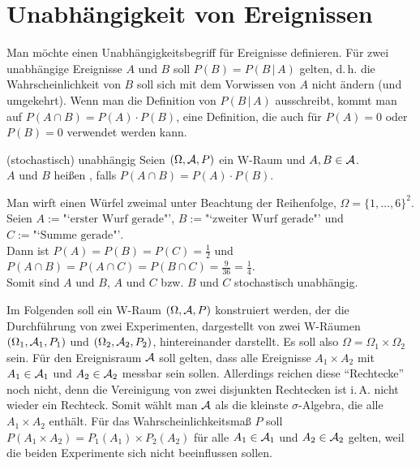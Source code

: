 \section{%
    Unabhängigkeit von Ereignissen%
}

\begin{Bem}
    Man möchte einen Unabhängigkeitsbegriff für Ereignisse definieren.
    Für zwei unabhängige Ereignisse $A$ und $B$ soll $P(B) = P(B \,|\, A)$ gelten,
    d.\,h. die Wahrscheinlichkeit von $B$ soll sich mit dem Vorwissen von $A$ nicht ändern
    (und umgekehrt).
    Wenn man die Definition von $P(B \,|\, A)$ ausschreibt, kommt man auf
    $P(A \cap B) = P(A) \cdot P(B)$, eine Definition, die auch für $P(A) = 0$ oder $P(B) = 0$
    verwendet werden kann.
\end{Bem}

\begin{Def}{(stochastisch) unabhängig}
    Seien $(\Omega, \mathcal{A}, P)$ ein W-Raum und $A, B \in \mathcal{A}$.\\
    $A$ und $B$ heißen , falls $P(A \cap B) = P(A) \cdot P(B)$.
\end{Def}

\begin{Bsp}
    Man wirft einen Würfel zweimal unter Beachtung der Reihenfolge,
    $\Omega = \{1, \dotsc, 6\}^2$.
    Seien $A := \text{"`erster Wurf gerade"'}$, $B := \text{"`zweiter Wurf gerade"'}$ und
    $C := \text{"`Summe gerade"'}$.\\
    Dann ist $P(A) = P(B) = P(C) = \frac{1}{2}$ und
    $P(A \cap B) = P(A \cap C) = P(B \cap C) = \frac{9}{36} = \frac{1}{4}$.\\
    Somit sind $A$ und $B$, $A$ und $C$ bzw. $B$ und $C$ stochastisch unabhängig.
\end{Bsp}

\linie
\pagebreak

\begin{Bem}
    Im Folgenden soll ein W-Raum $(\Omega, \mathcal{A}, P)$ konstruiert werden,
    der die Durchführung von zwei Experimenten, dargestellt von zwei W-Räumen
    $(\Omega_1, \mathcal{A}_1, P_1)$ und $(\Omega_2, \mathcal{A}_2, P_2)$, hintereinander darstellt.
    Es soll also $\Omega = \Omega_1 \times \Omega_2$ sein.
    Für den Ereignisraum $\mathcal{A}$ soll gelten, dass alle Ereignisse $A_1 \times A_2$ mit
    $A_1 \in \mathcal{A}_1$ und $A_2 \in \mathcal{A}_2$ messbar sein sollen.
    Allerdings reichen diese "`Rechtecke"' noch nicht, denn die Vereinigung von zwei disjunkten
    Rechtecken ist i.\,A. nicht wieder ein Rechteck.
    Somit wählt man $\mathcal{A}$ als die kleinste $\sigma$-Algebra, die alle $A_1 \times A_2$ enthält.
    Für das Wahrscheinlichkeitsmaß $P$ soll $P(A_1 \times A_2) = P_1(A_1) \times P_2(A_2)$ für alle
    $A_1 \in \mathcal{A}_1$ und $A_2 \in \mathcal{A}_2$ gelten, weil die beiden Experimente sich nicht
    beeinflussen sollen.
\end{Bem}

